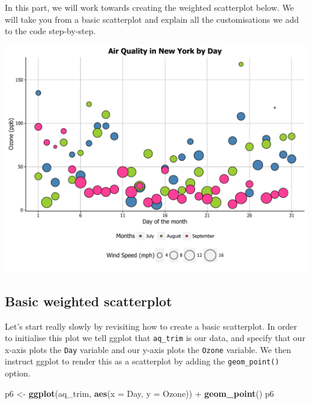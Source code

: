 \documentclass[]{article}
\newenvironment{Shaded}{\begin{snugshade}}{\end{snugshade}}
\newcommand{\KeywordTok}[1]{\textcolor[rgb]{0.13,0.29,0.53}{\textbf{{#1}}}}
\newcommand{\DataTypeTok}[1]{\textcolor[rgb]{0.13,0.29,0.53}{{#1}}}
\newcommand{\StringTok}[1]{\textcolor[rgb]{0.31,0.60,0.02}{{#1}}}
\newcommand{\NormalTok}[1]{{#1}}
\begin{document}
In this part, we will work towards creating the weighted scatterplot
below. We will take you from a basic scatterplot and explain all the
customisations we add to the code step-by-step.

\begin{center}\includegraphics{0_all_posts_pdf/wscatter_finalgraph-1} \end{center}

\subsection{Basic weighted
scatterplot}\label{basic-weighted-scatterplot}

Let's start really slowly by revisiting how to create a basic
scatterplot. In order to initialise this plot we tell ggplot that
\texttt{aq\_trim} is our data, and specify that our x-axis plots the
\texttt{Day} variable and our y-axis plots the \texttt{Ozone} variable.
We then instruct ggplot to render this as a scatterplot by adding the
\texttt{geom\_point()} option.

\begin{Shaded}
\begin{Highlighting}[]
\NormalTok{p6 <-}\StringTok{ }\KeywordTok{ggplot}\NormalTok{(aq_trim, }\KeywordTok{aes}\NormalTok{(}\DataTypeTok{x =} \NormalTok{Day, }\DataTypeTok{y =} \NormalTok{Ozone)) +}\StringTok{ }
\StringTok{      }\KeywordTok{geom_point}\NormalTok{()}
\NormalTok{p6}
\end{Highlighting}
\end{Shaded}
\end{document}
